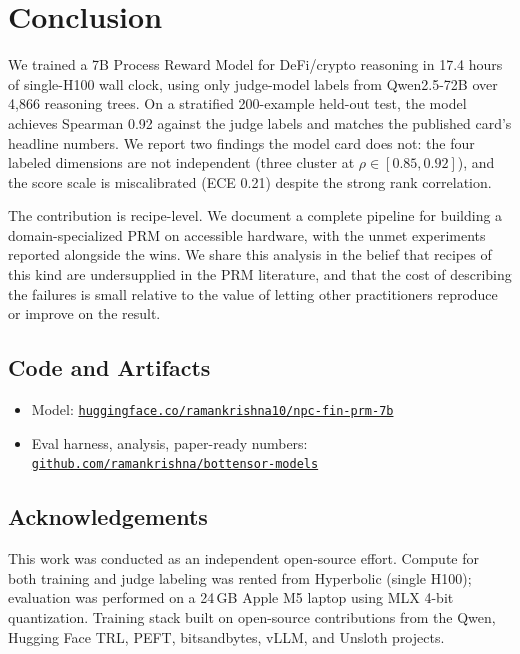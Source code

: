 \documentclass[10pt,letterpaper]{article}
\begin{document}
\section{Conclusion}

We trained a 7B Process Reward Model for DeFi/crypto reasoning in 17.4 hours of single-H100 wall clock, using only judge-model labels from Qwen2.5-72B over 4{,}866 reasoning trees. On a stratified 200-example held-out test, the model achieves Spearman 0.92 against the judge labels and matches the published card's headline numbers. We report two findings the model card does not: the four labeled dimensions are not independent (three cluster at $\rho \in [0.85, 0.92]$), and the score scale is miscalibrated (ECE 0.21) despite the strong rank correlation.

The contribution is recipe-level. We document a complete pipeline for building a domain-specialized PRM on accessible hardware, with the unmet experiments reported alongside the wins. We share this analysis in the belief that recipes of this kind are undersupplied in the PRM literature, and that the cost of describing the failures is small relative to the value of letting other practitioners reproduce or improve on the result.

\subsection*{Code and Artifacts}

\begin{itemize}[leftmargin=*,itemsep=0pt]
\item Model: \href{https://huggingface.co/ramankrishna10/npc-fin-prm-7b}{\texttt{huggingface.co/ramankrishna10/npc-fin-prm-7b}}
\item Eval harness, analysis, paper-ready numbers: \href{https://github.com/ramankrishna/bottensor-models/tree/main/training/npc-fin-prm-7b}{\texttt{github.com/ramankrishna/bottensor-models}}
\end{itemize}

\subsection*{Acknowledgements}

This work was conducted as an independent open-source effort. Compute for both training and judge labeling was rented from Hyperbolic (single H100); evaluation was performed on a 24\,GB Apple M5 laptop using MLX 4-bit quantization. Training stack built on open-source contributions from the Qwen, Hugging Face TRL, PEFT, bitsandbytes, vLLM, and Unsloth projects.
\end{document}
